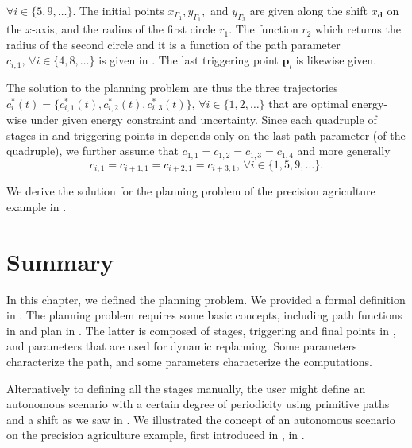 $\forall i\in\{5,9,\dots\}$. The initial points $x_{\Gamma_1},y_{\Gamma_1},$ and $y_{\Gamma_3}$ are given along the shift $x_\mathbf{d}$ on the $x$-axis, and the radius of the first circle $r_1$. The function $r_2$ which returns the radius of the second circle and it is a function of the path parameter $c_{i,1},\,\forall i\in\{4,8,\dots\}$ is given in . The last triggering point $\mathbf{p}_l$ is likewise given.

The solution to the planning problem are thus the three trajectories $c_i^*(t)=\{c_{i,1}^*(t),c_{i,2}^*(t),c_{i,3}^*(t)\},\,\forall i\in\{1,2,\dots\}$ that are optimal energy-wise under given energy constraint and uncertainty. 
Since each quadruple of stages in  and triggering points in  depends only on the last path parameter (of the quadruple), we further assume that $c_{1,1}=c_{1,2}=c_{1,3}=c_{1,4}$ and more generally 
\begin{equation}
c_{i,1}=c_{i+1,1}=c_{i+2,1}=c_{i+3,1},\,\forall i\in\{1,5,9,\dots\}.
\end{equation}

We derive the solution for the planning problem of the precision agriculture example in .


\section{Summary}

In this chapter, we defined the planning problem. We provided a formal definition in . The planning problem requires some basic concepts, including path functions in  and plan in . The latter is composed of stages, triggering and final points in , and parameters that are used for dynamic replanning. Some parameters characterize the path, and some parameters characterize the computations.

Alternatively to defining all the stages manually, the user might define an autonomous scenario with a certain degree of periodicity using primitive paths and a shift as we saw in . We illustrated the concept of an autonomous scenario on the precision agriculture example, first introduced in , in .

